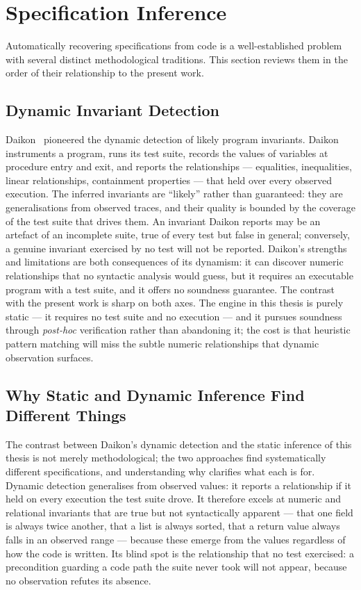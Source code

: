 \section{Specification Inference}
\label{sec:bg-inference}

Automatically recovering specifications from code is a well-established
problem with several distinct methodological traditions. This section reviews
them in the order of their relationship to the present work.

\subsection{Dynamic Invariant Detection}

Daikon~\cite{ernst2007daikon} pioneered the dynamic detection of likely
program invariants. Daikon instruments a program, runs its test suite, records
the values of variables at procedure entry and exit, and reports the
relationships --- equalities, inequalities, linear relationships, containment
properties --- that held over every observed execution. The inferred
invariants are ``likely'' rather than guaranteed: they are generalisations
from observed traces, and their quality is bounded by the coverage of the test
suite that drives them. An invariant Daikon reports may be an artefact of an
incomplete suite, true of every test but false in general; conversely, a
genuine invariant exercised by no test will not be reported. Daikon's
strengths and limitations are both consequences of its dynamism: it can
discover numeric relationships that no syntactic analysis would guess, but it
requires an executable program with a test suite, and it offers no soundness
guarantee. The contrast with the present work is sharp on both axes. The
engine in this thesis is purely static --- it requires no test suite and no
execution --- and it pursues soundness through \emph{post-hoc} verification
rather than abandoning it; the cost is that heuristic pattern matching will
miss the subtle numeric relationships that dynamic observation surfaces.

\subsection{Why Static and Dynamic Inference Find Different Things}

The contrast between Daikon's dynamic detection and the static inference of this
thesis is not merely methodological; the two approaches find systematically
different specifications, and understanding why clarifies what each is for. Dynamic
detection generalises from observed values: it reports a relationship if it held
on every execution the test suite drove. It therefore excels at numeric and
relational invariants that are true but not syntactically apparent --- that one
field is always twice another, that a list is always sorted, that a return value
always falls in an observed range --- because these emerge from the values
regardless of how the code is written. Its blind spot is the relationship that no
test exercised: a precondition guarding a code path the suite never took will not
appear, because no observation refutes its absence.

